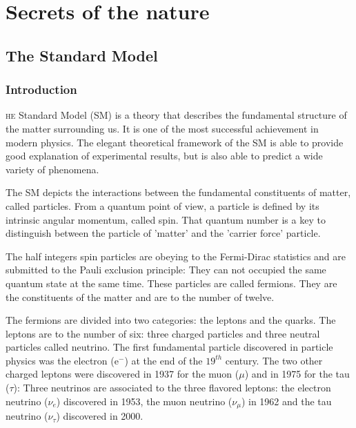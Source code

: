 \chapter{Secrets of the nature}

  \section{The Standard Model}

    \subsection{Introduction}
    
    \lettrine{}{he} Standard Model (SM) is a theory that describes the fundamental structure of the matter surrounding us. 
    It is one of the most successful achievement in modern physics.
    The elegant theoretical framework of the SM is able to provide good explanation of experimental results, but is also able to predict a wide variety of phenomena.

    The SM depicts the interactions between the fundamental constituents of matter, called particles.
    From a quantum point of view, a particle is defined by its intrinsic angular momentum, called spin. 
    That quantum number is a key to distinguish between the particle of 'matter' and the 'carrier force' particle.
    
    The half integers spin particles are obeying to the Fermi-Dirac statistics and are submitted to the Pauli exclusion principle:
    They can not occupied the same quantum state at the same time.
    These particles are called fermions.
    They are the constituents of the matter and are to the number of twelve.

    The fermions are divided into two categories: the leptons and the quarks. 
    The leptons are to the number of six: three charged particles and three neutral particles called neutrino.
    The first fundamental particle discovered in particle physics was the electron (e$^-$) at the end of the $19^{th}$ century.
    The two other charged leptons were discovered in 1937 for the muon ($\mu$) and in 1975 for the tau ($\tau$):
    Three neutrinos are associated to the three flavored leptons: the electron neutrino ($\nu_e$) discovered in 1953, the muon neutrino ($\nu_{\mu}$) in 1962 and the tau neutrino ($\nu_{\tau}$) discovered in 2000.

